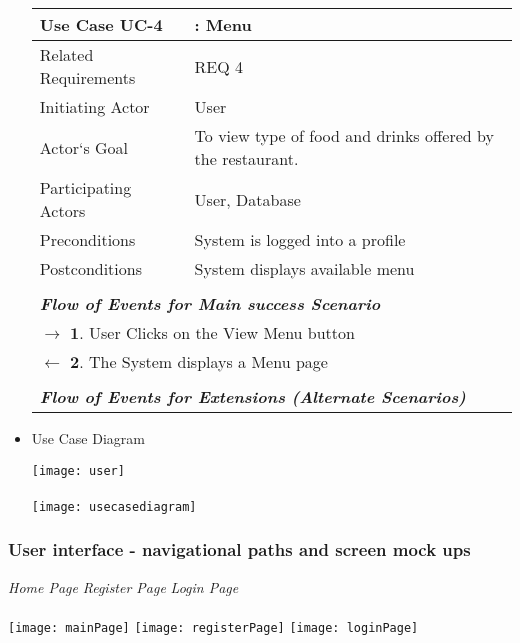 \documentclass[15, notitlepage]{article}
\begin{document}
\begin{itemize}
\begin{center}
\begin{tabular}{|l l|}
		\hline
		\rowcolor{yellow}
		Use Case UC-4 & :  Menu\\
		\hline
		Related Requirements & REQ 4\\
		Initiating Actor & User\\
		Actor`s Goal & To view type of food and drinks offered by the restaurant.\\
		Participating Actors & User, Database\\
		Preconditions & System is logged into a profile\\
		Postconditions & System displays available menu\\ & \\
		\multicolumn{2}{|l|}{\textit{\textbf{Flow of Events for Main success Scenario }}}\\
		\multicolumn{2}{|l|}{$\to$ $\mathbf{1.}$ User Clicks on the View Menu button }\\
		\multicolumn{2}{|l|}{$\gets$ $\mathbf{2.}$ The System displays a Menu page }\\ & \\
		\multicolumn{2}{|l|}{\textit{\textbf{Flow of Events for Extensions (Alternate Scenarios) }}}\\
		
		\hline 
	\end{tabular}		
\end{center}

\newpage

\item Use Case Diagram

\texttt{[image: user]}\\\\
\texttt{[image: usecasediagram]}
\end{itemize}
\newpage
\subsubsection{User interface - navigational paths and screen mock ups}
\textit{Home Page} \hfill \textit{Register Page} \hfill \textit{Login Page} \\\\
\texttt{[image: mainPage]} \hfill
\texttt{[image: registerPage]} \hfill
\texttt{[image: loginPage]} \hfill
\end{document}
